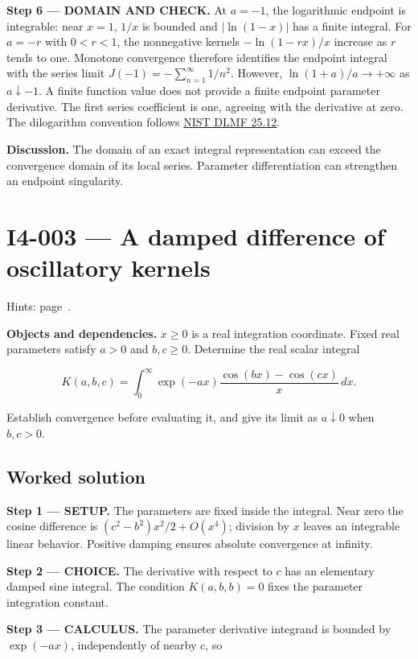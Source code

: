 \documentclass[11pt,oneside,openany]{book}
\begin{document}
\begin{DomainStep}
\textbf{Step 6 --- DOMAIN AND CHECK.} At \(a=-1\), the logarithmic endpoint is integrable: near \(x=1\), \(1/x\) is bounded and \(|\ln(1-x)|\) has a finite integral. For \(a=-r\) with \(0<r<1\), the nonnegative kernels \(-\ln(1-rx)/x\) increase as \(r\) tends to one. Monotone convergence therefore identifies the endpoint integral with the series limit \(J(-1)=-\sum_{n=1}^\infty1/n^2\). However, \(\ln(1+a)/a\to+\infty\) as \(a\downarrow-1\). A finite function value does not provide a finite endpoint parameter derivative. The first series coefficient is one, agreeing with the derivative at zero. The dilogarithm convention follows \href{https://dlmf.nist.gov/25.12}{NIST DLMF 25.12}.

\end{DomainStep}
\textbf{Discussion.} The domain of an exact integral representation can exceed the convergence domain of its local series. Parameter differentiation can strengthen an endpoint singularity.
\clearpage
\section{I4-003 --- A damped difference of oscillatory kernels}
\label{problem:I4-003}
{\small Hints: page~\pageref{hints:I4-003}.}\par\medskip

\textbf{Objects and dependencies.} \(x\ge0\) is a real integration coordinate. Fixed real parameters satisfy \(a>0\) and \(b,c\ge0\). Determine the real scalar integral

\[
K(a,b,c)=\int_0^\infty\exp(-ax)\frac{\cos(bx)-\cos(cx)}{x}\,dx.
\]

Establish convergence before evaluating it, and give its limit as \(a\downarrow0\) when \(b,c>0\).
\subsection*{Worked solution}

\textbf{Step 1 --- SETUP.} The parameters are fixed inside the integral. Near zero the cosine difference is \((c^2-b^2)x^2/2+O(x^4)\); division by \(x\) leaves an integrable linear behavior. Positive damping ensures absolute convergence at infinity.

\begin{ChoiceStep}
\textbf{Step 2 --- CHOICE.} The derivative with respect to \(c\) has an elementary damped sine integral. The condition \(K(a,b,b)=0\) fixes the parameter integration constant.

\end{ChoiceStep}
\textbf{Step 3 --- CALCULUS.} The parameter derivative integrand is bounded by \(\exp(-ax)\), independently of nearby \(c\), so
\end{document}
